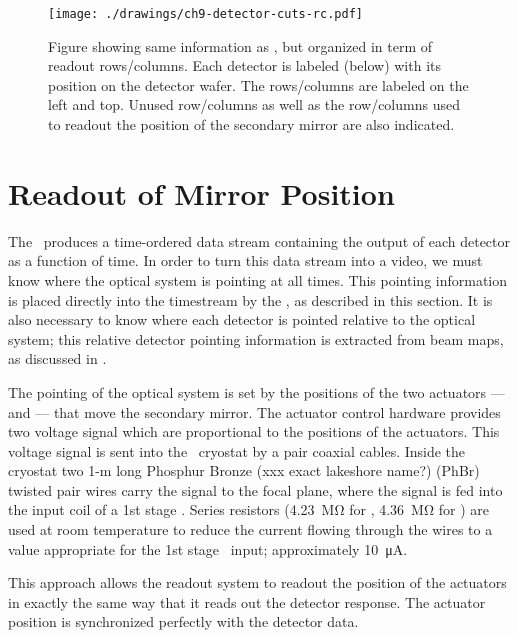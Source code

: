 \begin{figure}
\centering
\texttt{[image: ./drawings/ch9-detector-cuts-rc.pdf]}
\caption{Figure showing same information as , but organized in term of readout rows/columns. Each detector is labeled (below) with its position on the detector wafer. The rows/columns are labeled on the left and top. Unused row/columns as well as the row/columns used to readout the position of the secondary mirror are also indicated. }
\label{fig:detector-cuts-rc}
\end{figure}


\section{Readout of Mirror Position}\label{s:mirror-readout}

The \Imager\ produces a time-ordered data stream containing the output of each detector as a function of time.
In order to turn this data stream into a video, we must know where the optical system is pointing at all times.
This pointing information is placed directly into the timestream by the \Imager, as described in this section.
It is also necessary to know where each detector is pointed relative to the optical system; this relative detector pointing information is extracted from beam maps, as discussed in .

The pointing of the optical system is set by the positions of the two actuators ---  and  --- that move the secondary mirror.
The actuator control hardware provides two voltage signal which are proportional to the positions of the actuators.
This voltage signal is sent into the \Imager\ cryostat by a pair coaxial cables.
Inside the cryostat two 1-m long Phosphur Bronze (xxx exact lakeshore name?) (PhBr)  twisted pair wires carry the signal to the focal plane, where the signal is fed into the input coil of a 1st stage \SQUID.
Series resistors (\SI{4.23}{\mega\ohm} for , \SI{4.36}{\mega\ohm} for ) are used at room temperature to reduce the current flowing through the wires to a value appropriate for the 1st stage \SQUID\ input; approximately \SI{10}{\uA}.

This approach allows the readout system to readout the position of the actuators in exactly the same way that it reads out the detector response.
The actuator position is synchronized perfectly with the detector data.

